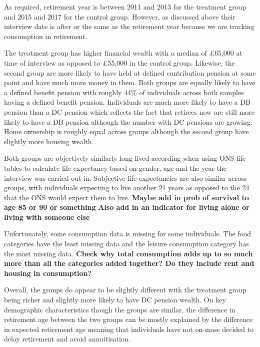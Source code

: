 \documentclass[12pt]{article}
\begin{document}
As required, retirement year is between 2011 and 2013 for the treatment group and 2015 and 2017 for the control group.
However, as discussed above their interview date is after or the same as the retirement year because we are tracking
consumption in retirement.

The treatment group has higher financial wealth with a median of £65,000 at time of interview as opposed to £55,000
in the control group. Likewise, the second group are more likely to have held at defined contribution pension at some point
and have much more money in them. Both groups are equally likely to have a defined benefit pension with roughly 44\% of
individuals across both samples having a defined benefit pension. Individuals are much more likely to have a DB pension
than a DC pension which reflects the fact that retirees now are still more likely to have a DB pension although the number
with DC pensions are growing. Home ownership is roughly equal across groups although the second group have slightly more
housing wealth.

Both groups are objectively similarly long-lived according when using ONS life tables to calculate life expectancy
based on gender, age and the year the interview was carried out in. Subjective life expectancies are also similar
across groups, with individuals expecting to live another 21 years as opposed to the 24 that the ONS would expect
them to live. \textbf{Maybe add in prob of survival to age 85 or 90 or something}
\textbf{Also add in an indicator for living alone or living with someone else}

Unfortunately, some consumption data is missing for some individuals. The food categories have the least missing data
and the leisure consumption category has the most missing data. \textbf{Check why total consumption adds up to so much
    more than all the categories added together? Do they include rent and housing in consumption?}


Overall, the groups do appear to be slightly different with the treatment group being richer and slightly more likely
to have DC pension wealth. On key demographic characteristics though the groups are similar, the difference in retirement
age between the two groups can be mostly explained by the difference in expected retirement age meaning that individuals
have not on-mass decided to delay retirement and avoid annuitisation.




\begin{landscape}

    

\end{landscape}
\end{document}
